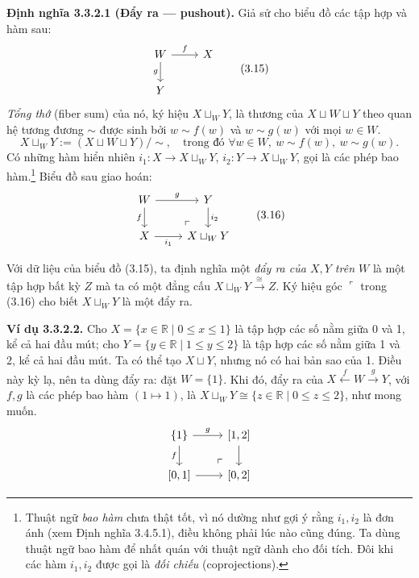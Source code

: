 \noindent\textbf{Định nghĩa 3.3.2.1 (Đẩy ra --- pushout).} Giả sử cho biểu đồ các tập hợp và hàm sau:
\begin{equation*}\begin{tikzcd}W\arrow[r,"f"]\arrow[d,"g"']&X\\Y&\end{tikzcd}\tag{3.15}\end{equation*}
\emph{Tổng thớ} (fiber sum) của nó, ký hiệu $X\sqcup_WY$, là thương của $X\sqcup W\sqcup Y$ theo quan hệ tương đương $\sim$ được sinh bởi $w\sim f(w)$ và $w\sim g(w)$ với mọi $w\in W$.
\[X\sqcup_WY:=(X\sqcup W\sqcup Y)/{\sim},\quad\text{trong đó }\forall w\in W,\ w\sim f(w),\ w\sim g(w).\]
Có những hàm hiển nhiên $i_1:X\to X\sqcup_WY$, $i_2:Y\to X\sqcup_WY$, gọi là các phép bao hàm.\footnote{Thuật ngữ \emph{bao hàm} chưa thật tốt, vì nó dường như gợi ý rằng $i_1,i_2$ là đơn ánh (xem Định nghĩa 3.4.5.1), điều không phải lúc nào cũng đúng. Ta dùng thuật ngữ bao hàm để nhất quán với thuật ngữ dành cho đối tích. Đôi khi các hàm $i_1,i_2$ được gọi là \emph{đối chiếu} (coprojections).} Biểu đồ sau giao hoán:
\begin{equation*}\begin{tikzcd}W\arrow[r,"g"]\arrow[d,"f"']&Y\arrow[d,"i_2"]\\X\arrow[r,"i_1"']&X\sqcup_WY\arrow[ul,phantom,"\ulcorner",very near start]\end{tikzcd}\tag{3.16}\end{equation*}

Với dữ liệu của biểu đồ (3.15), ta định nghĩa một \emph{đẩy ra của $X,Y$ trên $W$} là một tập hợp bất kỳ $Z$ mà ta có một đẳng cấu $X\sqcup_WY\xrightarrow{\cong}Z$. Ký hiệu góc $\ulcorner$ trong (3.16) cho biết $X\sqcup_WY$ là một đẩy ra.

\noindent\textbf{Ví dụ 3.3.2.2.} Cho $X=\{x\in\mathbb R\mid0\le x\le1\}$ là tập hợp các số nằm giữa 0 và 1, kể cả hai đầu mút; cho $Y=\{y\in\mathbb R\mid1\le y\le2\}$ là tập hợp các số nằm giữa 1 và 2, kể cả hai đầu mút. Ta có thể tạo $X\sqcup Y$, nhưng nó có hai bản sao của 1. Điều này kỳ lạ, nên ta dùng đẩy ra: đặt $W=\{1\}$. Khi đó, đẩy ra của $X\xleftarrow{f}W\xrightarrow{g}Y$, với $f,g$ là các phép bao hàm $(1\mapsto1)$, là $X\sqcup_WY\cong\{z\in\mathbb R\mid0\le z\le2\}$, như mong muốn.
\[\begin{tikzcd}\{1\}\arrow[r,"g"]\arrow[d,"f"']&{[1,2]}\arrow[d]\\{[0,1]}\arrow[r]&{[0,2]}\arrow[ul,phantom,"\ulcorner",very near start]\end{tikzcd}\]


